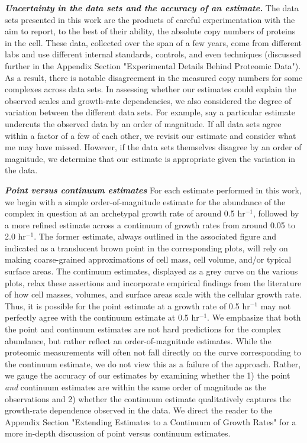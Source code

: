 \begin{featurebox}
\textbf{\itshape Uncertainty in the data sets and the accuracy of an estimate.}
The data sets presented in this work are the products of careful experimentation
with the aim to report, to the best of their ability, the absolute copy numbers
of proteins in the cell. These data, collected over the span of a few years,
come from different labs and use different internal standards, controls, and
even techniques (discussed further in the Appendix Section "Experimental Details
Behind Proteomic Data"). As a result, there is notable disagreement in the
measured copy numbers for some complexes across data sets. In assessing whether
our estimates could explain the observed scales and growth-rate dependencies, we
also considered the degree of variation between the different data sets. For
example, say a particular estimate undercuts the observed data by an order of
magnitude. If all data sets agree within a factor of a few of each other, we
revisit our estimate and consider what me may have missed. However, if the data
sets themselves disagree by an order of magnitude, we determine that our
estimate is appropriate given the variation in the data.
\label{box:estimate_rules}

\textbf{\itshape  Point versus continuum estimates}
For each estimate performed in this work, we begin with a simple
order-of-magnitude estimate for the abundance of the complex in question at
an archetypal growth rate of around 0.5 hr$^{-1}$, followed by a more refined
estimate across a continuum of growth rates from around 0.05 to 2.0
hr$^{-1}$. The former estimate, always outlined in the associated figure and
indicated as a translucent brown point in the corresponding plots, will rely
on making coarse-grained approximations of cell mass, cell volume, and/or
typical surface areas. The continuum estimates, displayed as a grey curve on
the various plots, relax these assertions and incorporate empirical findings
from the literature of how cell masses, volumes, and surface areas scale with
the cellular growth rate. Thus, it is possible for the point estimate at a
growth rate of 0.5 hr$^{-1}$ may not perfectly agree with the continuum
estimate at 0.5 hr$^{-1}$. We emphasize that both the point and continuum
estimates are not hard predictions for the complex abundance, but rather
reflect an order-of-magnitude estimates. While the proteomic measurements
will often not fall directly on the curve corresponding to the continuum
estimate, we do not view this as a failure of the approach. Rather, we gauge
the accuracy of our estimates by examining whether the 1) the point
\textit{and} continuum estimates are within the same order of magnitude as
the observations and 2) whether the continuum estimate qualitatively captures
the growth-rate dependence observed in the data. We direct the reader to the
Appendix Section "Extending Estimates to a Continuum of Growth Rates" for a more in-depth discussion of point versus continuum estimates.

\end{featurebox}


